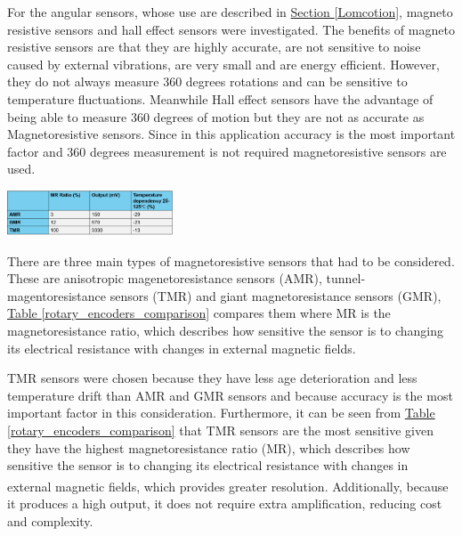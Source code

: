 \documentclass[11pt]{article}		%
\newcommand{\supercite}[1]{\textsuperscript{\cite{#1}}}		%
\newcommand{\tableref}[1]{\hyperref[#1]{Table \ref*{#1}}}     %
\newcommand{\sectref}[1]{\hyperref[#1]{Section \ref*{#1}}}     %
\begin{document}
            For the angular sensors, whose use are described in \sectref{Lomcotion}, magneto resistive sensors and hall effect sensors were investigated. The benefits of magneto resistive sensors are that they are highly accurate, are not sensitive to noise caused by external vibrations, are very small and are energy efficient. However, they do not always measure 360 degrees rotations and can be sensitive to temperature fluctuations. Meanwhile Hall effect sensors have the advantage of being able to measure 360 degrees of motion but they are not as accurate as Magnetoresistive sensors. Since in this application accuracy is the most important factor and 360 degrees measurement is not required magnetoresistive sensors are used.
           \begin{floatingfigure}[r]{0.4\textwidth}
					\centering
					\includegraphics[width=0.37\textwidth] {AMR_comparison table_formatted}
					\label{rotary_encoders_comparison}
			\end{floatingfigure}
          \hspace*{3ex} There are three main types of magnetoresistive sensors that had to be considered. These are anisotropic magenetoresistance sensors (AMR), tunnel- magentoresistance sensors (TMR) and giant magnetoresistance sensors (GMR), \tableref{rotary_encoders_comparison} compares them where MR is the magnetoresistance ratio, which describes how sensitive the sensor is to changing its electrical resistance with changes in external magnetic fields.
          
    \begin{floatingfigure}[r]{0pt} \end{floatingfigure}
    
    TMR sensors were chosen because they have less age deterioration and less temperature drift than AMR and GMR sensors and because accuracy is the most important factor in this consideration. Furthermore, it can be seen from \tableref{rotary_encoders_comparison} that TMR sensors are the most sensitive given they have the highest magnetoresistance ratio (MR), which describes how sensitive the sensor is to changing its electrical resistance with changes in external magnetic fields,\supercite{magnetoresistance} which provides greater resolution. Additionally, because it produces a high output, it does not require extra amplification, reducing cost and complexity.
\end{document}
